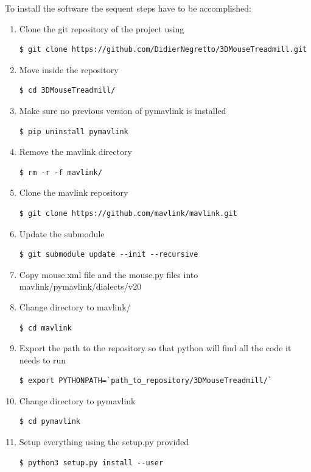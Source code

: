\documentclass[12pt,a4paper, twoside]{article}
\begin{document}
To install the software the sequent steps have to be accomplished:
\begin{enumerate}
	\item Clone the git repository of the project using 
	\begin{lstlisting}[style = Bashstyle]
	$ git clone https://github.com/DidierNegretto/3DMouseTreadmill.git
	\end{lstlisting}
	\item Move inside the repository
	\begin{lstlisting}[style = Bashstyle]
	$ cd 3DMouseTreadmill/
	\end{lstlisting}
	\item Make sure no previous version of pymavlink is installed
	\begin{lstlisting}[style = Bashstyle]
	$ pip uninstall pymavlink
	\end{lstlisting}
	\item Remove the mavlink directory
	\begin{lstlisting}[style = Bashstyle]
	$ rm -r -f mavlink/
	\end{lstlisting}
	\item Clone the mavlink repository
	\begin{lstlisting}[style = Bashstyle]
	$ git clone https://github.com/mavlink/mavlink.git
	\end{lstlisting}
	\item Update the submodule
	\begin{lstlisting}[style = Bashstyle]
	$ git submodule update --init --recursive
	\end{lstlisting}
	\item Copy mouse.xml file and the mouse.py files into mavlink/pymavlink/dialects/v20 
	\item Change directory to mavlink/
	\begin{lstlisting}[style = Bashstyle]
	$ cd mavlink
	\end{lstlisting}
	\item Export the path to the repository so that python will find all the code it needs to run
	\begin{lstlisting}[style = Bashstyle]
	$ export PYTHONPATH=`path_to_repository/3DMouseTreadmill/`
	\end{lstlisting}
	\item Change directory to pymavlink
	\begin{lstlisting}[style = Bashstyle]
	$ cd pymavlink
	\end{lstlisting}
	\item Setup everything using the setup.py provided
	\begin{lstlisting}[style = Bashstyle]
	$ python3 setup.py install --user
	\end{lstlisting}
	
\end{enumerate}
\end{document}
